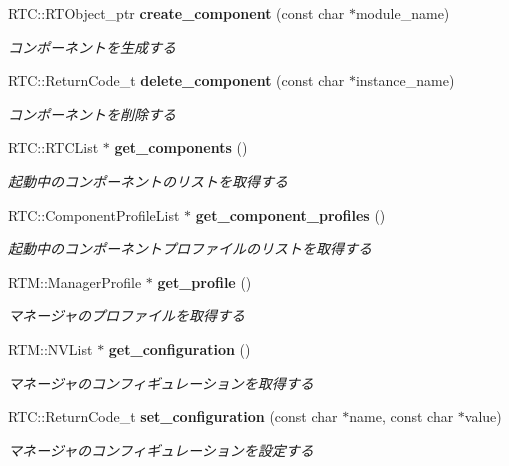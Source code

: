 \begin{DoxyCompactItemize}
RTC::RTObject\_\-ptr {\bf create\_\-component} (const char $\ast$module\_\-name)
\begin{DoxyCompactList}\small\item\em コンポーネントを生成する \item\end{DoxyCompactList}\item 
RTC::ReturnCode\_\-t {\bf delete\_\-component} (const char $\ast$instance\_\-name)
\begin{DoxyCompactList}\small\item\em コンポーネントを削除する \item\end{DoxyCompactList}\item 
RTC::RTCList $\ast$ {\bf get\_\-components} ()
\begin{DoxyCompactList}\small\item\em 起動中のコンポーネントのリストを取得する \item\end{DoxyCompactList}\item 
RTC::ComponentProfileList $\ast$ {\bf get\_\-component\_\-profiles} ()
\begin{DoxyCompactList}\small\item\em 起動中のコンポーネントプロファイルのリストを取得する \item\end{DoxyCompactList}\item 
RTM::ManagerProfile $\ast$ {\bf get\_\-profile} ()
\begin{DoxyCompactList}\small\item\em マネージャのプロファイルを取得する \item\end{DoxyCompactList}\item 
RTM::NVList $\ast$ {\bf get\_\-configuration} ()
\begin{DoxyCompactList}\small\item\em マネージャのコンフィギュレーションを取得する \item\end{DoxyCompactList}\item 
RTC::ReturnCode\_\-t {\bf set\_\-configuration} (const char $\ast$name, const char $\ast$value)
\begin{DoxyCompactList}\small\item\em マネージャのコンフィギュレーションを設定する \item\end{DoxyCompactList}\item 

\end{DoxyCompactItemize}
